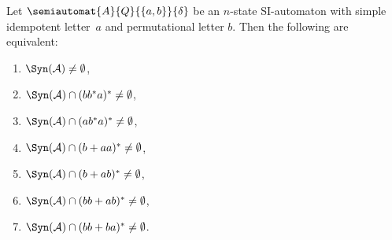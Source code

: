 \begin{lemma}\label{constrsync:subclasses:SI:equiv-unconstrained}
	Let $\semiautomat{A}{Q}{\{a,b\}}{\delta}$ be an $n$-state SI-automaton
	with simple idempotent letter~$a$
	and permutational letter $b$.
	Then the following are equivalent:
	\begin{enumerate}
		\item \label{constrsync:subclasses:SI:equiv-unconstrained:1} $\Syn(\mathcal A) \ne \emptyset$,
		
		\item \label{constrsync:subclasses:SI:equiv-unconstrained:2} $\Syn(\mathcal A) \cap (bb^*a)^* \ne \emptyset$,
		
		\item \label{constrsync:subclasses:SI:equiv-unconstrained:3} $\Syn(\mathcal A) \cap (ab^*a)^* \ne \emptyset$,
		
		\item \label{constrsync:subclasses:SI:equiv-unconstrained:4} $\Syn(\mathcal A)  \cap (b+aa)^* \ne \emptyset$,
		
		\item \label{constrsync:subclasses:SI:equiv-unconstrained:5} $\Syn(\mathcal A)  \cap (b+ab)^* \ne \emptyset$,
		
		\item \label{constrsync:subclasses:SI:equiv-unconstrained:6} $\Syn(\mathcal A) \cap (bb+ab)^* \ne \emptyset$,
		
		\item \label{constrsync:subclasses:SI:equiv-unconstrained:7} $\Syn(\mathcal A) \cap (bb+ba)^* \ne \emptyset$.
	\end{enumerate}	

\end{lemma}
